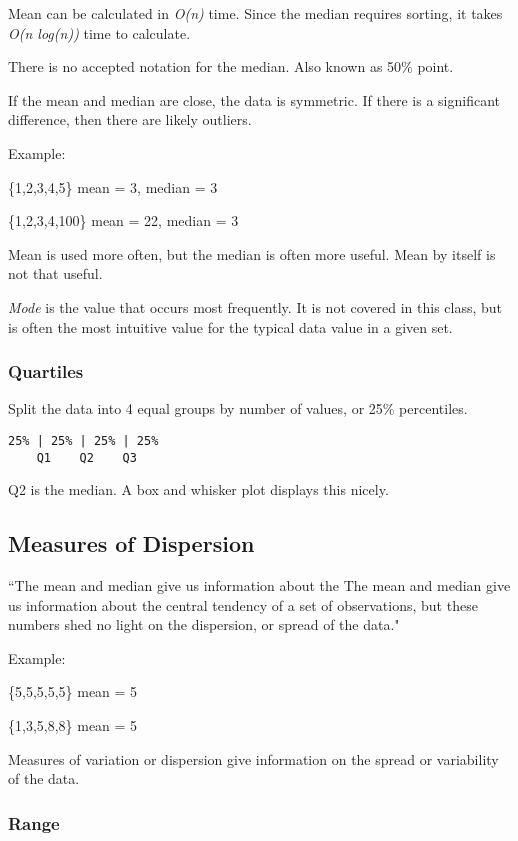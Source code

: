\documentclass[11pt, oneside]{article}   	%
\begin{document}
Mean can be calculated in \textit{O(n)} time. Since the median requires sorting, it takes \textit{O(n log(n))} time to calculate.

There is no accepted notation for the median. Also known as 50\% point.

If the mean and median are close, the data is symmetric. If there is a significant difference, then there are likely outliers.

Example:

\{1,2,3,4,5\} mean = 3, median = 3

\{1,2,3,4,100\} mean = 22, median = 3

Mean is used more often, but the median is often more useful. Mean by itself is not that useful.

\textit{Mode} is the value that occurs most frequently. It is not covered in this class, but is often the most intuitive value for the typical data value in a given set.

\subsubsection{Quartiles}

Split the data into 4 equal groups by number of values, or 25\% percentiles.

\begin{verbatim}
25% | 25% | 25% | 25% 
    Q1    Q2    Q3
\end{verbatim}
Q2 is the median. A box and whisker plot displays this nicely.

\subsection{Measures of Dispersion}

``The mean and median give us information about the The mean and median give us information about the
central tendency of a set of observations, but these
numbers shed no light on the dispersion, or spread
of the data."

Example:

\{5,5,5,5,5\} mean = 5

\{1,3,5,8,8\} mean = 5

Measures of variation or dispersion give information on the spread or variability of the data.

\subsubsection{Range}
\end{document}
